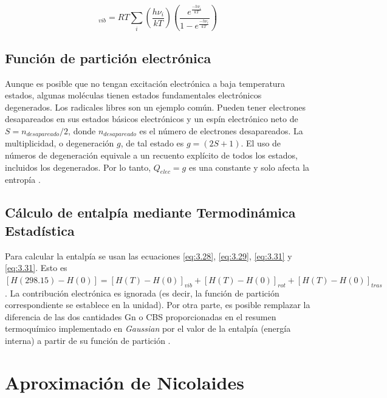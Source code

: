 \begin{equation}
[H(T)-H(0)]_{vib}=RT \sum_i \left(\frac{h\nu_i}{kT}\right)\left(\frac{e^{\frac{-h\nu_i}{kT}}}{1-e^{\frac{-h\nu_i}{kT}}}\right)
\label{eq:3.31}
\end{equation}

\subsection{Función de partición electrónica}

Aunque es posible que no tengan excitación electrónica a baja temperatura estados, algunas moléculas tienen estados fundamentales electrónicos degenerados. Los radicales libres son un ejemplo común. Pueden tener electrones desapareados en sus estados básicos electrónicos y un espín electrónico neto de $S = n_{desapareado}/2$, donde $n_{desapareado}$ es el número de electrones desapareados. La multiplicidad, o degeneración $g$, de tal estado es $g = (2S+1)$. El uso de números de degeneración equivale a un recuento explícito de todos los estados, incluidos los degenerados. Por lo tanto, $Q_{elec} = g$ es una constante y solo afecta la entropía \cite{Irikura1998}.\\


\subsection{Cálculo de entalpía mediante Termodinámica Estadística}

Para calcular la entalpía se usan las ecuaciones \ref{eq:3.28}, \ref{eq:3.29}, \ref{eq:3.31} y \ref{eq:3.31}. Esto es $[H(298.15)-H(0)] = [H(T)-H(0)]_{vib}+[H(T)-H(0)]_{rot}+[H(T)-H(0)]_{tras}$. La contribución electrónica es ignorada (es decir, la función de partición correspondiente se establece en la unidad). Por otra parte, es posible remplazar la diferencia de las dos cantidades Gn o CBS proporcionadas en el resumen termoquímico  implementado en \textit{Gaussian} por el valor de la entalpía (energía interna) a partir de su función de partición \cite{Irikura1998}.


\section{Aproximación de Nicolaides}

